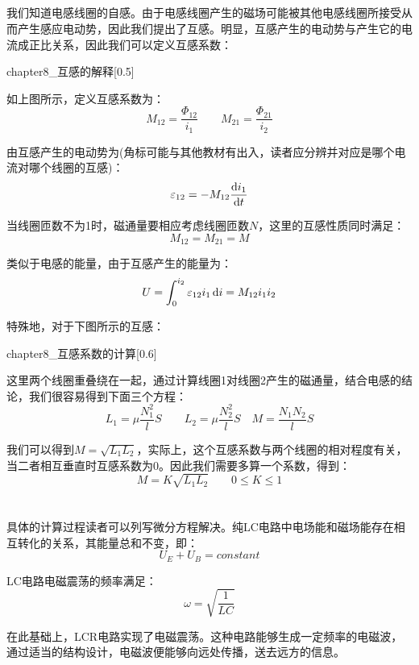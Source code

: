 \subsection[互感]{}
我们知道电感线圈的自感。由于电感线圈产生的磁场可能被其他电感线圈所接受从而产生感应电动势，因此我们提出了互感。明显，互感产生的电动势与产生它的电流成正比关系，因此我们可以定义互感系数：
\begin{law}
    \begin{singlefigure}[互感的定义]{chapter8_互感的解释}[0.5]
    \end{singlefigure}
    如上图所示，定义互感系数为：
    \[M_{12} = \dfrac{\Phi_{12}}{i_1} \qquad M_{21} = \dfrac{\Phi_{21}}{i_2}\]

    由互感产生的电动势为(角标可能与其他教材有出入，读者应分辨并对应是哪个电流对哪个线圈的互感)：
    \[\varepsilon_{12} = -M_{12}\dfrac{\dif{i_1}}{\dif{t}}\]

    当线圈匝数不为1时，磁通量要相应考虑线圈匝数$N$，这里的互感性质同时满足：
    \[M_{12} = M_{21} = M\]

    类似于电感的能量，由于互感产生的能量为：
    \[U = \int_0^{i_2}\varepsilon_{12}i_1\dif i = M_{12}i_1i_2\]
\end{law}

特殊地，对于下图所示的互感：
\begin{singlefigure}[互感]{chapter8_互感系数的计算}[0.6]
\end{singlefigure}

这里两个线圈重叠绕在一起，通过计算线圈1对线圈2产生的磁通量，结合电感的结论，我们很容易得到下面三个方程：
\[L_1 = \mu\dfrac{N_1^2}{l}S \qquad L_2 = \mu\dfrac{N_2^2}{l}S \quad M = \dfrac{N_1N_2}lS\]

我们可以得到$M = \sqrt{L_1 L_2}$，实际上，这个互感系数与两个线圈的相对程度有关，当二者相互垂直时互感系数为0。因此我们需要多算一个系数，得到：
\[M = K\sqrt{L_1 L_2}\qquad 0\leq K\leq 1\]
\section[LC电路与电路震荡]{}
具体的计算过程读者可以列写微分方程解决。纯LC电路中电场能和磁场能存在相互转化的关系，其能量总和不变，即：
\[U_E + U_B = constant\]

LC电路电磁震荡的频率满足：
\[\omega = \sqrt{\dfrac{1}{LC}}\]

在此基础上，LCR电路实现了电磁震荡。这种电路能够生成一定频率的电磁波，通过适当的结构设计，电磁波便能够向远处传播，送去远方的信息。
